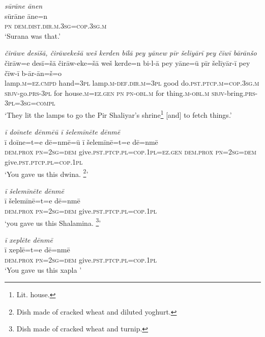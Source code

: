 \ea \label{RE.61}
\textit{sūrāne ānen} \\ 
\gll sūrāne āne=n \\ 
 \textsc{pn} \textsc{dem.dist}\textsc{.dir}\textsc{.m}\textsc{.3sg}\textsc{=cop}\textsc{.3sg}\textsc{.m} \\ 
\glt `Surana was that.'
\z 
 
\ea \label{ŽE.42}
\textit{čirāwe desīšā, čirāwekešā weš kerden bilā pey yānew pīr šelīyārī pey čīwī bārānšo} \\ 
\gll čirāw=e desī=šā čirāw-eke=šā weš kerde=n bi-l-ā pey yāne=ū pīr šelīyār-ī pey čīw-ī b-ār-ān=š=o \\ 
 lamp\textsc{.m}\textsc{=ez}\textsc{.cmpd} hand\textsc{=3pl} lamp\textsc{.m}\textsc{-def}\textsc{.dir}\textsc{.m}\textsc{=3pl} good do\textsc{.pst}\textsc{.ptcp}\textsc{.m}\textsc{=cop}\textsc{.3sg}\textsc{.m} \textsc{sbjv-}go\textsc{.prs}\textsc{-3pl} for house\textsc{.m}\textsc{\textsc{=ez.gen}} \textsc{pn} \textsc{pn}\textsc{-obl}\textsc{.m} for thing\textsc{.m}\textsc{-obl}\textsc{.m} \textsc{sbjv-}bring\textsc{.prs}\textsc{-3pl}\textsc{=3sg}\textsc{=compl} \\ 
\glt `They lit the lamps to go the Pir Shaliyar’s shrine\footnote{Lit. house.} [and] to fetch things.'
\z 
 
\ea \label{ŽE.50}
\textit{ī doīnete dēnmēū ī šelemīnēte dēnmē} \\ 
\gll ī doīne=t=e dē=nmē=ū ī šelemīnē=t=e dē=nmē \\ 
 \textsc{dem.prox} \textsc{pn}\textsc{=\textsc{2sg}}\textsc{=dem} give\textsc{.pst}\textsc{.ptcp}\textsc{.pl}\textsc{=cop}\textsc{.1pl}\textsc{\textsc{=ez.gen}} \textsc{dem.prox} \textsc{pn}\textsc{=\textsc{2sg}}\textsc{=dem} give\textsc{.pst}\textsc{.ptcp}\textsc{.pl}\textsc{=cop}\textsc{.1pl} \\ 
\glt `You gave us this dwina. \footnote{Dish made of cracked wheat and diluted yoghurt.}'
\z 
 
\ea \label{ŽE.51}
\textit{ī šelemīnēte dēnmē} \\ 
\gll ī šelemīnē=t=e dē=nmē \\ 
 \textsc{dem.prox} \textsc{pn}\textsc{=\textsc{2sg}}\textsc{=dem} give\textsc{.pst}\textsc{.ptcp}\textsc{.pl}\textsc{=cop}\textsc{.1pl} \\ 
\glt `you gave us this Shalamina. \footnote{Dish made of cracked wheat and turnip.}'
\z 
 
\ea \label{ŽE.52}
\textit{ī xeplēte dēnmē} \\ 
\gll ī xeplē=t=e dē=nmē \\ 
 \textsc{dem.prox} \textsc{pn}\textsc{=\textsc{2sg}}\textsc{=dem} give\textsc{.pst}\textsc{.ptcp}\textsc{.pl}\textsc{=cop}\textsc{.1pl} \\ 
\glt `You gave us this xapla '
\z 
 
